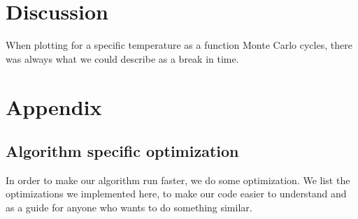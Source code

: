 \documentclass[reprint, english,notitlepage,nofootinbib]{revtex4-1}  %
\begin{document}
\section{Discussion}

When plotting for a specific temperature as a function Monte Carlo cycles, there was always what we could describe as a break in time.

\section{Appendix}
\subsection{Algorithm specific optimization}

In order to make our algorithm run faster, we do some optimization. We list the optimizations we implemented here, to make our code easier to understand and as a guide for anyone who wants to do something similar.
\end{document}
